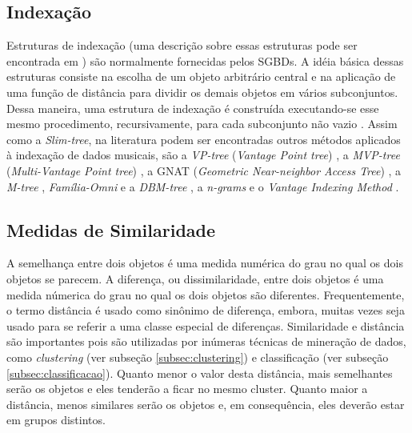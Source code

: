 \subsection{Indexação}\label{subsec:indexacao}
Estruturas de indexação (uma descrição sobre essas estruturas pode ser encontrada em \cite{garciaMolina2002}) são normalmente fornecidas pelos SGBDs. A idéia básica dessas estruturas consiste na escolha de um objeto arbitrário central e na aplicação de uma função de distância para dividir os demais objetos em vários subconjuntos. Dessa maneira, uma estrutura de indexação é construída executando-se esse mesmo procedimento, recursivamente, para cada subconjunto não vazio \cite{barioni2006}. Assim como a \textit{Slim-tree}, na literatura podem ser encontradas outros métodos aplicados à indexação de dados musicais, são a \textit{VP-tree} (\textit{Vantage Point tree}) \cite{yanilos1993}, a \textit{MVP-tree} (\textit{Multi-Vantage Point tree}) \cite{bozkaya1997}, a GNAT (\textit{Geometric Near-neighbor Access Tree}) \cite{brin1995}, a \textit{M-tree} \cite{ciaccia1997}, \textit{Família-Omni} e a \textit{DBM-tree} \cite{filho2001, vieira2004}, a \textit{n-grams} \cite{downie1999} e o \textit{Vantage Indexing Method} \cite{typke2003}.

\subsection{Medidas de Similaridade} \label{subsec:medidas-similaridade}
A semelhança entre dois objetos é uma medida numérica do grau no qual os dois objetos se parecem. A diferença, ou dissimilaridade, entre dois objetos é uma medida númerica do grau no qual os dois objetos são diferentes. Frequentemente, o termo distância é usado como sinônimo de diferença, embora, muitas vezes seja usado para se referir a uma classe especial de diferenças. Similaridade e distância são importantes pois são utilizadas por inúmeras técnicas de mineração de dados, como \textit{clustering} (ver subseção \ref{subsec:clustering}) e classificação (ver subseção \ref{subsec:classificacao}). Quanto menor o valor desta distância, mais semelhantes serão os objetos e eles tenderão a ficar no mesmo cluster. Quanto maior a distância, menos similares serão os objetos e, em consequência, eles deverão estar em grupos distintos.

